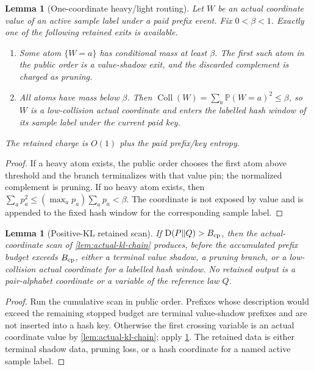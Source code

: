\documentclass[11pt]{article}
\newcommand{\Cref}[1]{\ref{#1}}
\newtheorem{lemma}[theorem]{Lemma}
\theoremstyle{remark}
\newcommand{\Prob}{\mathbb P}
\newcommand{\KL}{\mathrm D}
\newcommand{\Coll}{\operatorname{Coll}}
\begin{document}
\begin{lemma}[One-coordinate heavy/light routing]\label{lem:heavy-light-routing}
Let $W$ be an actual coordinate value of an active sample label under a paid prefix event.  Fix $0<\beta<1$.  Exactly one of the following retained exits is available.
\begin{enumerate}[label=\textup{(\alph*)}]
\item Some atom $\{W=a\}$ has conditional mass at least $\beta$.  The first such atom in the public order is a value-shadow exit, and the discarded complement is charged as pruning.
\item All atoms have mass below $\beta$.  Then $\Coll(W)=\sum_a\Prob(W=a)^2\le \beta$, so $W$ is a low-collision actual coordinate and enters the labelled hash window of its sample label under the current paid key.
\end{enumerate}
The retained charge is $O(1)$ plus the paid prefix/key entropy.
\end{lemma}

\begin{proof}
If a heavy atom exists, the public order chooses the first atom above threshold and the branch terminalizes with that value pin; the normalized complement is pruning.  If no heavy atom exists, then $\sum_a p_a^2\le (\max_a p_a)\sum_a p_a<\beta$.  The coordinate is not exposed by value and is appended to the fixed hash window for the corresponding sample label.
\end{proof}

\begin{lemma}[Positive-KL retained scan]\label{lem:positive-kl-retained-scan}
If $\KL(P\|Q)>B_{\rm cp}$, then the actual-coordinate scan of \Cref{lem:actual-kl-chain} produces, before the accumulated prefix budget exceeds $B_{\rm cp}$, either a terminal value shadow, a pruning branch, or a low-collision actual coordinate for a labelled hash window.  No retained output is a pair-alphabet coordinate or a variable of the reference law $Q$.
\end{lemma}

\begin{proof}
Run the cumulative scan in public order.  Prefixes whose description would exceed the remaining stopped budget are terminal value-shadow prefixes and are not inserted into a hash key.  Otherwise the first crossing variable is an actual coordinate value by \Cref{lem:actual-kl-chain}; apply \Cref{lem:heavy-light-routing}.  The retained data is either terminal shadow data, pruning loss, or a hash coordinate for a named active sample label.
\end{proof}
\end{document}
